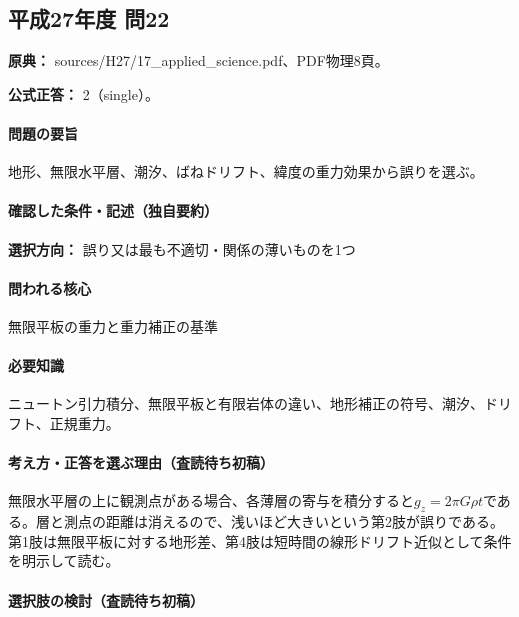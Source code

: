 \subsection{平成27年度 問22}
\label{q:h27-reg-applied-22}

\noindent\textbf{原典：} sources/H27/17\_applied\_science.pdf、PDF物理8頁。

\textbf{公式正答：} 2（single）。

\paragraph{問題の要旨} 地形、無限水平層、潮汐、ばねドリフト、緯度の重力効果から誤りを選ぶ。

\paragraph{確認した条件・記述（独自要約）}\mbox{}\par

\noindent\textbf{選択方向：} 誤り又は最も不適切・関係の薄いものを1つ\par

\paragraph{問われる核心} 無限平板の重力と重力補正の基準

\paragraph{必要知識} ニュートン引力積分、無限平板と有限岩体の違い、地形補正の符号、潮汐、ドリフト、正規重力。

\paragraph{考え方・正答を選ぶ理由（査読待ち初稿）} 無限水平層の上に観測点がある場合、各薄層の寄与を積分すると\(g_z=2\pi G\rho t\)である。層と測点の距離は消えるので、浅いほど大きいという第2肢が誤りである。第1肢は無限平板に対する地形差、第4肢は短時間の線形ドリフト近似として条件を明示して読む。

\paragraph{選択肢の検討（査読待ち初稿）}\mbox{}\par

